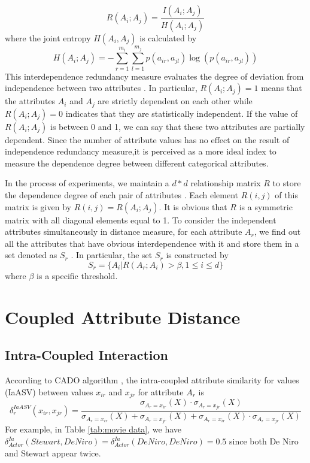 \documentclass[review]{elsarticle}
\begin{document}
\begin{equation}
R(A_i;A_j) = \frac{I(A_i;A_j)}{H(A_i;A_j)}
\label{equ11}
\end{equation}
where the joint entropy $H(A_i,A_j)$ is calculated by
\begin{equation}
H(A_i;A_j) = - \sum_{r=1}^{m_i}\sum_{l=1}^{m_j}p(a_{ir},a_{jl})\log(p(a_{ir},a_{jl}))
\label{equ12}
\end{equation}
This interdependence redundancy measure evaluates the degree of deviation from independence between two attributes \cite{WaiHoAu2005Grouping}. In particular, $R(A_i;A_j) = 1$ means that the attributes $A_i$ and $A_j$ are strictly dependent on each other while $R(A_i;A_j) = 0$ indicates that they are statistically independent. If the value of $R(A_i;A_j)$ is between 0 and 1, we can say that these two attributes are partially dependent. Since the number of attribute values has no effect on the result of independence redundancy measure,it is perceived as a more ideal index to measure the dependence degree between different categorical attributes.

In the process of experiments, we maintain a $d*d$ relationship matrix $R$ to store the dependence degree of each pair of attributes \cite{JiaH2016NewMetric}. Each element $R(i,j)$ of this matrix is given by $R(i,j) = R(A_i;A_j)$. It is obvious that $R$ is a symmetric matrix with all diagonal elements equal to 1. To consider the independent attributes simultaneously in distance measure, for each attribute $A_r$, we find out all the attributes that have obvious interdependence with it and store them in a set denoted as $S_r$ \cite{JiaH2016NewMetric}. In particular, the set $S_r$ is constructed by
\begin{equation}
S_r = \{A_i|R(A_r;A_i) > \beta, 1 \leq i \leq d \}
\label{equ13}
\end{equation}
where $\beta$ is a specific threshold.

\section{Coupled Attribute Distance}
\subsection{Intra-Coupled Interaction}
According to CADO algorithm \cite{WangC2015CADO}, the intra-coupled attribute similarity for values (IaASV) between values $x_{ir}$ and $x_{jr}$ for attribute $A_r$ is
\begin{equation}
\delta_{r}^{IaASV}(x_{ir},x_{jr}) = \frac{\sigma_{A_r = x_{ir}}(X) \cdot \sigma_{A_r = x_{jr}}(X)}{\sigma_{A_r = x_{ir}}(X) + \sigma_{A_r = x_{jr}}(X) + \sigma_{A_r = x_{ir}}(X) \cdot \sigma_{A_r = x_{jr}}(X)}
\label{equ14}
\end{equation}
For example, in Table \ref{tab:movie data}, we have $\delta_{Actor}^{Ia}(Stewart,De Niro) = \delta_{Actor}^{Ia}(De Niro,De Niro) = 0.5$ since both De Niro and Stewart appear twice.
\end{document}
